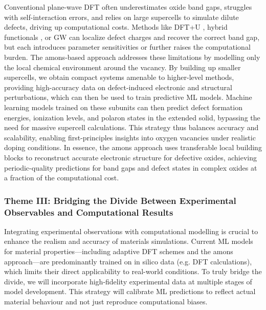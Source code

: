 \documentclass[11pt,letterpaper]{article}
\begin{document}
Conventional plane-wave DFT often underestimates oxide band gaps, struggles with self-interaction errors, and relies on large supercells to simulate dilute defects, driving up computational costs. Methods like DFT+U \cite{wang2006oxidation,aykol2014local,macke2024orbital}, hybrid functionals \cite{gruneis2014ionization, chen2014band}, or GW \cite{chen2017accuracy} can localize defect charges and recover the correct band gap, but each introduces parameter sensitivities or further raises the computational burden. The amons-based approach addresses these limitations by modelling only the local chemical environment around the vacancy.  By building up smaller supercells, we obtain compact systems amenable to higher-level methods, providing high-accuracy data on defect-induced electronic and structural perturbations, which can then be used to train predictive ML models. Machine learning models trained on these subunits can then predict defect formation energies, ionization levels, and polaron states in the extended solid, bypassing the need for massive supercell calculations. This strategy thus balances accuracy and scalability, enabling first-principles insights into oxygen vacancies under realistic doping conditions. In essence, the amons approach uses transferable local building blocks to reconstruct accurate electronic structure for defective oxides, achieving periodic-quality predictions for band gaps and defect states in complex oxides at a fraction of the computational cost.




\subsubsection*{Theme III: Bridging the Divide Between Experimental Observables and Computational Results}

Integrating experimental observations with computational modelling is crucial to enhance the realism and accuracy of materials simulations. Current ML models for material properties---including adaptive DFT schemes and the amons approach---are predominantly trained on in silico data (e.g. DFT calculations), which limits their direct applicability to real-world conditions. To truly bridge the divide, we will incorporate high-fidelity experimental data at multiple stages of model development. This strategy will calibrate ML predictions to reflect actual material behaviour and not just reproduce computational biases.
\end{document}
